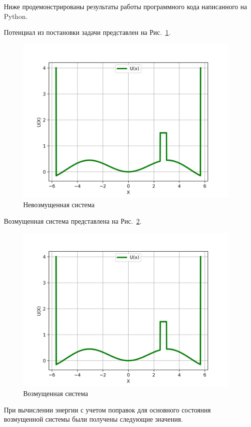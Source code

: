 Ниже продемонстрированы результаты работы программного кода написанного на Python.


Потенциал из постановки задачи представлен на Рис.~\ref{fig:u0_x}.

\graphicspath{{../python_results}}

\begin{figure}[h]
\centering
    \includegraphics[width=0.8\linewidth]{U(X)}
    \caption{Невозмущенная система}\label{fig:u0_x}
\end{figure}

Возмущенная система представлена на Рис.~\ref{fig:u_x}.

\begin{figure}[h]
\centering
    \includegraphics[width=0.8\linewidth]{U(X)}
    \caption{Возмущенная система}\label{fig:u_x}
\end{figure}

При вычислении энергии с учетом поправок для основного состояния возмущенной системы были получены следующие значения.


